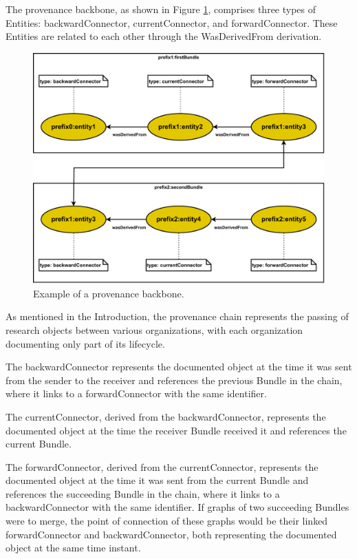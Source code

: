 \documentclass[
  digital,     %
  oneside,     %
  nosansbold,  %
  nocolorbold, %
  lof,         %
  lot,         %
]{fithesis4}
\begin{document}
The provenance backbone, as shown in Figure \ref{fig:bundleconnection}, comprises three types of Entities: backwardConnector, currentConnector, and forwardConnector. These Entities are related to each other through the WasDerivedFrom derivation.  

\begin{figure}[htbp]
  \begin{center}
    \includegraphics[width=12.5cm]{fithesis/images/backbone.pdf}
  \end{center}
  \caption{Example of a provenance backbone.}
  \label{fig:bundleconnection}
\end{figure}

As mentioned in the Introduction, the provenance chain represents the passing of research objects between various organizations, with each organization documenting only part of its lifecycle.

The backwardConnector represents the documented object at the time it was sent from the sender to the receiver and references the previous Bundle in the chain, where it links to a forwardConnector with the same identifier.

The currentConnector, derived from the backwardConnector, represents the documented object at the time the receiver Bundle received it and references the current Bundle.

The forwardConnector, derived from the currentConnector, represents the documented object at the time it was sent from the current Bundle and references the succeeding Bundle in the chain, where it links to a backwardConnector with the same identifier. If graphs of two succeeding Bundles were to merge, the point of connection of these graphs would be their linked forwardConnector and backwardConnector, both representing the documented object at the same time instant.
\end{document}
